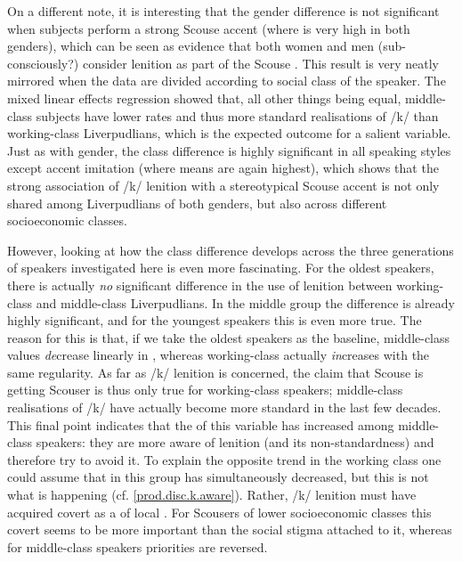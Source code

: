 On a different note, it is interesting that the gender difference is not significant when subjects perform a strong Scouse accent (where  is very high in both genders), which can be seen as evidence that both women and men (sub-consciously?) consider lenition as part of the Scouse .
This result is very neatly mirrored when the data are divided according to social class of the speaker.
The mixed linear effects regression showed that, all other things being equal, middle-class subjects have lower  rates and thus more standard realisations of /k/ than working-class Liverpudlians, which is the expected outcome for a salient variable.
Just as with gender, the class difference is highly significant in all speaking styles except accent imitation (where  means are again highest), which shows that the strong association of /k/ lenition with a stereotypical Scouse accent is not only shared among Liverpudlians of both genders, but also across different socioeconomic classes.

However, looking at how the class difference develops across the three generations of speakers investigated here is even more fascinating.
For the oldest speakers, there is actually \emph{no} significant difference in the use of lenition between working-class and middle-class Liverpudlians.
In the middle group the difference is already highly significant, and for the youngest speakers this is even more true.
The reason for this is that, if we take the oldest speakers as the baseline, middle-class  values \emph{de}crease linearly in , whereas working-class  actually \emph{in}creases with the same regularity.
As far as /k/ lenition is concerned, the claim that Scouse is getting Scouser is thus only true for working-class speakers; middle-class realisations of /k/ have actually become more standard in the last few decades.
This final point indicates that the  of this variable has increased among middle-class speakers: they are more aware of lenition (and its non-standardness) and therefore try to avoid it.
To explain the opposite trend in the working class one could assume that  in this group has simultaneously decreased, but this is not what is happening (cf. \ref{prod.disc.k.aware}).
Rather, /k/ lenition must have acquired covert  as a  of local .
For Scousers of lower socioeconomic classes this covert  seems to be more important than the social stigma attached to it, whereas for middle-class speakers priorities are reversed.


